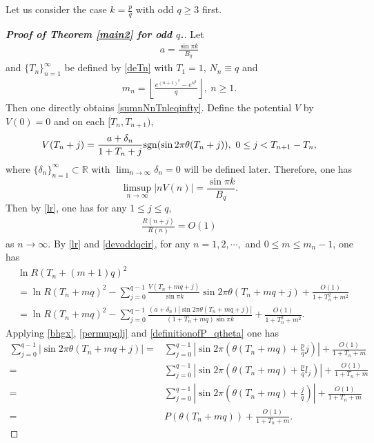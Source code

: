 \documentclass[12pt]{amsart}
\newcommand{\abs}[1]{\left\lvert #1 \right\rvert}
\theoremstyle{plain}
\theoremstyle{definition}
\begin{document}
	Let us consider the case $k=\frac{p}{q}$  with odd $q\geq3$ first. 
	\begin{proof}[\textbf{Proof of Theorem \ref{main2} for odd $q$.}] Let
		\begin{align}
		a=\frac{\sin\pi k}{B_q}\label{oddaBq}	
		\end{align}	
and $\{T_n\}_{n=1}^{\infty}$ be defined by \eqref{deTn} with $T_1=1$,
$N_n\equiv q$ and 
\begin{align}
m_n=\left\lfloor\frac{e^{(n+1)^3}-e^{n^3}}{q}\right\rfloor,\ n\geq 1.\nonumber
\end{align}
Then one directly obtains \eqref{sumnNnTnleqinfty}.
Define the potential $V$ by $V(0)=0$ and on each $[{T}_{n},{T}_{n+1})$,
		\begin{align}
			V(T_n+j)=\frac{a+\delta_{n}}{1+
T_n+j}{\rm{sgn}}(\sin2\pi\theta(T_n+j)), \ 0\leq j<T_{n+1}-T_n,\label{devoddqcir}
		\end{align}
		where $\{\delta_{n}\}_{n=1}^{\infty}\subset \mathbb{R}$ with 
		$\lim_{n\to\infty}\delta_{n}=0$
		will be defined later. Therefore, one has
		$$\limsup_{n\to \infty}\abs{nV(n)}=\frac{\sin\pi k}{B_q}.$$ Then by \eqref{lr}, one has for any $1\leq j\leq q$,
\begin{align}
\frac{R(n+j)}{R(n)}=O(1)\label{oddO1}
\end{align}
as $n\to\infty$.
	By \eqref{lr} and \eqref{devoddqcir},  for any $n=1,2,\cdots,$ and $0\leq m \leq {m}_{n}-1$, one has
\begin{align}
&\ln R(T_n+(m+1)q)^2\nonumber\\
&=\ln R(T_n+mq)^2-\sum_{j=0}^{q-1}\frac{V(T_n+mq+j)}{\sin\pi k}\sin2\pi\theta(T_n+mq+j)+\frac{O(1)}{1+T_n^2+m^2}\nonumber\\
&=\ln R(T_n+mq)^2-\sum_{j=0}^{q-1}\frac{(a+\delta_n)\abs{\sin2\pi\theta(T_n+mq+j)}}{(1+T_n+mq)\sin\pi k}+\frac{O(1)}{1+T_n^2+m^2}.\label{criticaloddlnr}
\end{align}
Applying \eqref{bhgx}, \eqref{permupqlj} and \eqref{definitionofP_qtheta} one has
\begin{align}
\sum_{j=0}^{q-1}\abs{\sin2\pi\theta(T_n+mq+j)}=&\sum_{j=0}^{q-1}\abs{\sin2\pi\left(\theta(T_n+mq)+\frac{p}{q}j\right)}+\frac{O(1)}{1+T_n+m}\nonumber\\
=&\sum_{j=0}^{q-1}\abs{\sin2\pi\left(\theta(T_n+mq)+\frac{p}{q}{l_j}\right)}+\frac{O(1)}{1+T_n+m}\nonumber\\
=&\sum_{j=0}^{q-1}\abs{\sin2\pi\left(\theta(T_n+mq)+\frac{j}{q}\right)}+\frac{O(1)}{1+T_n+m}\nonumber\\
=&P(\theta(T_n+mq))+\frac{O(1)}{1+T_n+m}.\nonumber

\end{align}
\end{proof}
\end{document}
